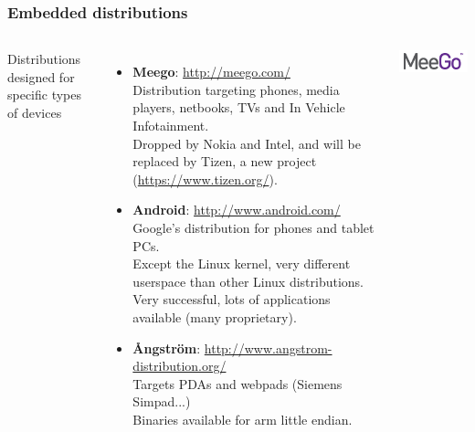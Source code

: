 \begin{frame}
  \frametitle{Embedded distributions}
  \small
  \begin{columns}
    Distributions designed for specific types of devices
    \begin{itemize}
    \item {\bf Meego}: \url{http://meego.com/}\\
      Distribution targeting phones, media players, netbooks, TVs and
      In Vehicle Infotainment.\\
      Dropped by Nokia and Intel, and will be replaced by Tizen, a new
      project (\url{https://www.tizen.org/}).
    \item {\bf Android}: \url{http://www.android.com/}\\
      Google's distribution for phones and tablet PCs.\\
      Except the Linux kernel, very different userspace
      than other Linux distributions. Very successful,
      lots of applications available (many proprietary).
    \item {\bf Ångström}: \url{http://www.angstrom-distribution.org/}\\
      Targets PDAs and webpads (Siemens Simpad...)\\
      Binaries available for arm little endian.
    \end{itemize}
    \includegraphics[width=\textwidth]{slides/sysdev-embedded-linux/meego.png}\\

\end{columns}
\end{frame}
